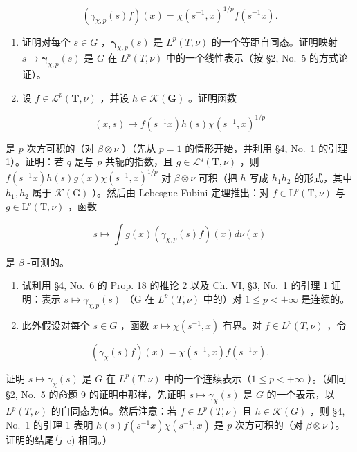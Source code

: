 \[
\left(\gamma_ {\chi , p} (s) f\right) (x) = \chi (s ^ {- 1}, x) ^ {1 / p} f (s ^ {- 1} x).
\]

\begin{enumerate}
\def\labelenumi{\alph{enumi})}
\item
  证明对每个 \(s \in G\) ，\(\pmb{\gamma}_{\chi,p}(s)\) 是 \(L^p(T, \nu)\) 的一个等距自同态。证明映射 \(s \mapsto \pmb{\gamma}_{\chi,p}(s)\) 是 \(G\) 在 \(L^p(T, \nu)\) 中的一个线性表示（按 §2, No.~5 的方式论证）。
\item
  设 \(f \in \mathcal{L}^p(\mathbf{T}, \nu)\) ，并设 \(h \in \mathcal{K}(\mathbf{G})\) 。证明函数
\end{enumerate}

\[
(x, s) \mapsto f (s ^ {- 1} x) h (s) \chi (s ^ {- 1}, x) ^ {1 / p}
\]

是 \(p\) 次方可积的（对 \(\beta \otimes \nu\) ）（先从 \(p = 1\) 的情形开始，并利用 §4, No.~1 的引理 1）。证明：若 \(q\) 是与 \(p\) 共轭的指数，且 \(g \in \mathcal{L}^q(\mathrm{T}, \nu)\) ，则 \(f(s^{-1}x)h(s)g(x)\chi(s^{-1},x)^{1/p}\) 对 \(\beta\otimes\nu\) 可积（把 \(h\) 写成 \(h_1h_2\) 的形式，其中 \(h_1,h_2\) 属于 \(\mathcal{K}(\mathrm{G})\) ）。然后由 Lebesgue-Fubini 定理推出：对 \(f\in\mathrm{L}^{p}(\mathrm{T},\nu)\) 与 \(g\in\mathrm{L}^{q}(\mathrm{T},\nu)\) ，函数

\[
s \mapsto \int g (x) (\gamma_ {\chi , p} (s) f) (x) d \nu (x)
\]

是 \(\beta\) -可测的。

\begin{enumerate}
\def\labelenumi{\alph{enumi})}
\setcounter{enumi}{2}
\item
  试利用 §4, No.~6 的 Prop. 18 的推论 2 以及 Ch. VI, §3, No.~1 的引理 1 证明：表示 \(s \mapsto \gamma_{\chi,p}(s)\) （G 在 \(L^p(T, \nu)\) 中的）对 \(1 \leqslant p < +\infty\) 是连续的。
\item
  此外假设对每个 \(s \in G\) ，函数 \(x \mapsto \chi(s^{-1}, x)\) 有界。对 \(f \in L^{p}(T, \nu)\) ，令
\end{enumerate}

\[
\left(\gamma_ {\chi} (s) f\right) (x) = \chi (s ^ {- 1}, x) f (s ^ {- 1} x).
\]

证明 \(s \mapsto \gamma_{\chi}(s)\) 是 \(G\) 在 \(L^p(T, \nu)\) 中的一个连续表示（\(1 \leqslant p < +\infty\) ）。（如同 §2, No.~5 的命题 9 的证明中那样，先证明 \(s \mapsto \gamma_{\chi}(s)\) 是 \(G\) 的一个表示，以 \(L^p(T, \nu)\) 的自同态为值。然后注意：若 \(f \in L^p(T, \nu)\) 且 \(h \in \mathcal{K}(G)\) ，则 §4, No.~1 的引理 1 表明 \(h(s)f(s^{-1}x)\chi(s^{-1}, x)\) 是 \(p\) 次方可积的（对 \(\beta \otimes \nu\) ）。证明的结尾与 c) 相同。）

